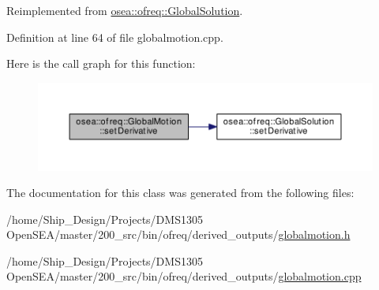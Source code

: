 Reimplemented from \hyperlink{classosea_1_1ofreq_1_1_global_solution_a537163391f1f55d073720b20f69acfa5}{osea\-::ofreq\-::\-Global\-Solution}.



Definition at line 64 of file globalmotion.\-cpp.



Here is the call graph for this function\-:\nopagebreak
\begin{figure}[H]
\begin{center}
\leavevmode
\includegraphics[width=350pt]{classosea_1_1ofreq_1_1_global_motion_a15a8c0d57ffedf65a1cd84154cdaa6ae_cgraph}
\end{center}
\end{figure}




The documentation for this class was generated from the following files\-:\begin{DoxyCompactItemize}
\item 
/home/\-Ship\-\_\-\-Design/\-Projects/\-D\-M\-S1305 Open\-S\-E\-A/master/200\-\_\-src/bin/ofreq/derived\-\_\-outputs/\hyperlink{globalmotion_8h}{globalmotion.\-h}\item 
/home/\-Ship\-\_\-\-Design/\-Projects/\-D\-M\-S1305 Open\-S\-E\-A/master/200\-\_\-src/bin/ofreq/derived\-\_\-outputs/\hyperlink{globalmotion_8cpp}{globalmotion.\-cpp}\end{DoxyCompactItemize}

